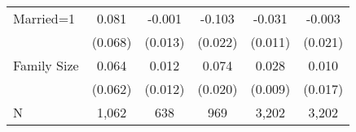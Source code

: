 {\begin{tabular}{l*{5}{c}}
\;Married=1     &    0.081         &   -0.001         &   -0.103\sym{***}&   -0.031\sym{**} &   -0.003         \\
                &  (0.068)         &  (0.013)         &  (0.022)         &  (0.011)         &  (0.021)         \\
\;Family Size   &    0.064         &    0.012         &    0.074\sym{***}&    0.028\sym{**} &    0.010         \\
                &  (0.062)         &  (0.012)         &  (0.020)         &  (0.009)         &  (0.017)         \\
\midrule
N               &    1,062         &      638         &      969         &    3,202         &    3,202         \\
\bottomrule
\end{tabular}
}
